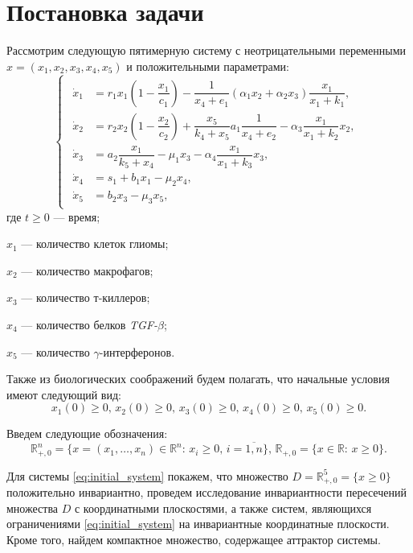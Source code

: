 \documentclass[12pt,a4paper]{extarticle}
\theoremstyle{definition}
\theoremstyle{definition}
\theoremstyle{definition}
\begin{document}
	\section{Постановка задачи}
	
	Рассмотрим следующую пятимерную систему с неотрицательными переменными $x=(x_1, x_2, x_3, x_4, x_5)$ и положительными параметрами:
	\begin{equation}
		\begin{cases}
			\begin{aligned}
				\dot{x}_1 &= r_1x_1\left(1-\dfrac{x_1}{c_1}\right)-\dfrac{1}{x_4+e_1}(\alpha_1x_2+\alpha_2x_3)\dfrac{x_1}{x_1+k_1},\\
				\dot{x}_2 &= r_2x_2\left(1-\dfrac{x_2}{c_2}\right)+\dfrac{x_5}{k_4+x_5}a_1\dfrac{1}{x_4+e_2}-\alpha_3\dfrac{x_1}{x_1+k_2}x_2,\\
				\dot{x}_3 &= a_2\dfrac{x_1}{k_5+x_4}-\mu_1x_3-\alpha_4\dfrac{x_1}{x_1+k_3}x_3,\\
				\dot{x}_4 &= s_1 + b_1x_1-\mu_2x_4,\\
				\dot{x}_5 &= b_2x_3-\mu_3x_5,
			\end{aligned}
		\end{cases}\label{eq:initial_system}
	\end{equation}
	где $t\ge0$ --- время;
	
	$x_1$ --- количество клеток глиомы;
	
	$x_2$ --- количество макрофагов;
	
	$x_3$ --- количество т-киллеров;
	
	$x_4$ --- количество белков \textit{TGF-}$\beta$;
	
	$x_5$ --- количество $\gamma$-интерферонов. 
	
	Также из биологических соображений будем полагать, что начальные условия имеют следующий вид:
	\begin{equation}\label{eq:conds}
	x_1(0)\ge0,\,x_2(0)\ge0,\,x_3(0)\ge0,\,x_4(0)\ge0,\,x_5(0)\ge0.
	\end{equation}
	
	Введем следующие обозначения:
	\[\mathbb{R}^n_{+,0}=\{x=(x_1,\dots,x_n)\in\mathbb{R}^n:\, x_i\ge0,\, i=\overline{1,n}\},\,\mathbb{R}_{+,0}=\{x\in\mathbb{R}:\, x\ge0\}.\]
	
	Для системы \ref{eq:initial_system} покажем, что множество $D=\mathbb{R}^{5}_{+,0} = \{x \ge 0\}$ положительно инвариантно, проведем исследование инвариантности пересечений множества $D$ с координатными плоскостями, а также систем, являющихся ограничениями \ref{eq:initial_system} на инвариантные координатные плоскости. Кроме того, найдем компактное множество, содержащее аттрактор системы.
	
\end{document}
